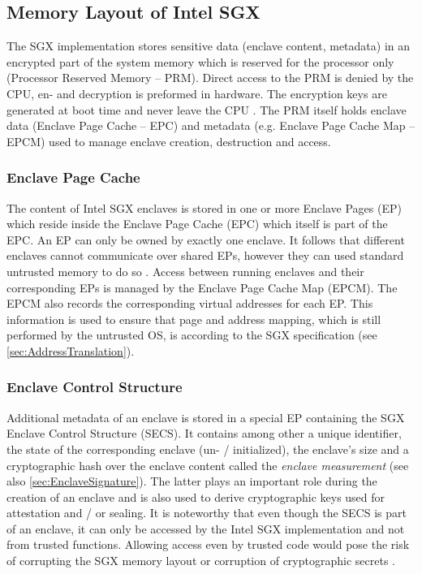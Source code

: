 \subsection{Memory Layout of Intel SGX}
The SGX implementation stores sensitive data (enclave content, metadata) in an encrypted part of the system memory which is reserved for the processor only (Processor
Reserved Memory -- PRM). Direct access to the PRM is denied by the CPU, en- and decryption is preformed in hardware. The encryption keys are generated at boot time and
never leave the CPU \cite{IntelSGXExplanation}. The PRM itself holds enclave data (Enclave Page Cache -- EPC) and metadata (e.g. Enclave Page Cache Map -- EPCM) used 
to manage enclave creation, destruction and access.

\subsubsection{Enclave Page Cache}
The content of Intel SGX enclaves is stored in one or more Enclave Pages (EP) which reside inside the Enclave Page Cache (EPC) which itself is part of the EPC. An EP
can only be owned by exactly one enclave. It follows that different enclaves cannot communicate over shared EPs, however they can used standard untrusted memory to
do so \cite{Costan2016IntelSE}. Access between running enclaves and their corresponding EPs is managed by the Enclave Page Cache Map (EPCM). The EPCM also records
the corresponding virtual addresses for each EP. This information is used to ensure that page and address mapping, which is still performed by the untrusted OS, 
is according to the SGX specification (see \cref{sec:AddressTranslation}). 

\subsubsection{Enclave Control Structure}
Additional metadata of an enclave is stored in a special EP containing the SGX Enclave Control Structure (SECS). It contains among other a unique identifier, the
state of the corresponding enclave (un- / initialized), the enclave's size and a cryptographic hash over the enclave content called the \textit{enclave measurement} (see
also \cref{sec:EnclaveSignature}). The latter plays an important role during the creation of an enclave and is also used to derive cryptographic keys used for attestation 
and / or sealing. It is noteworthy that even though the SECS is part of an enclave, it can only be accessed by the Intel SGX implementation and not from trusted functions. 
Allowing access even by trusted code would pose the risk of corrupting the SGX memory layout or corruption of cryptographic secrets \cite{Costan2016IntelSE}.

